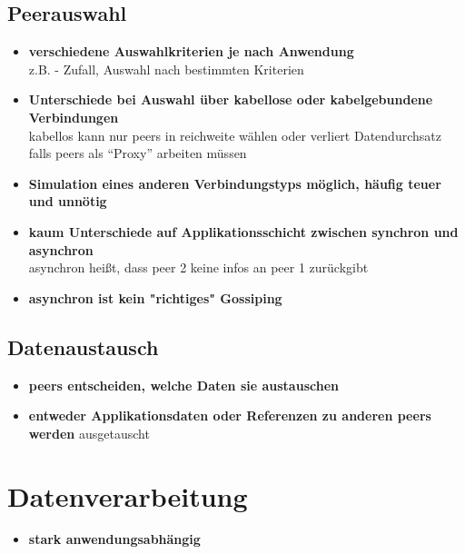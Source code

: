 \documentclass[10pt]{report}
\begin{document}
\subsection{Peerauswahl}
\begin{itemize}
	\item \textbf{verschiedene Auswahlkriterien je nach Anwendung\\}
	z.B. - Zufall, Auswahl nach bestimmten Kriterien
\item \textbf{Unterschiede bei Auswahl über kabellose oder kabelgebundene Verbindungen\\}
	kabellos kann nur peers in reichweite wählen oder verliert Datendurchsatz falls peers als ``Proxy'' arbeiten müssen
\item \textbf{Simulation eines anderen Verbindungstyps möglich, häufig teuer und unnötig}
\item \textbf{kaum Unterschiede auf Applikationsschicht zwischen synchron und asynchron\\}
	asynchron heißt, dass peer 2 keine infos an peer 1 zurückgibt
\item \textbf{asynchron ist kein "richtiges" Gossiping}
\end{itemize}
\subsection{Datenaustausch}
\begin{itemize}
	\item \textbf{peers entscheiden, welche Daten sie austauschen}
	\item \textbf{entweder Applikationsdaten oder Referenzen zu anderen peers werden}
  ausgetauscht
\end{itemize}
\section{Datenverarbeitung}
\begin{itemize}
	\item \textbf{stark anwendungsabhängig}
\end{itemize}
\end{document}
